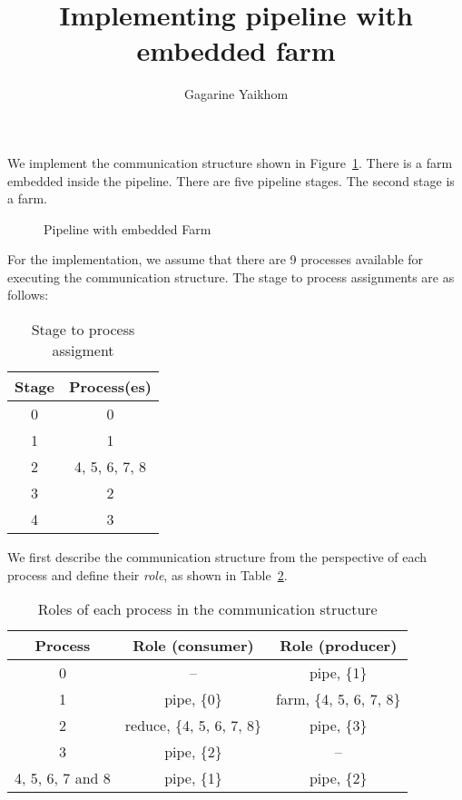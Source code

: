 \documentclass[a4paper,11pt]{amsart}
\title{Implementing pipeline with embedded farm}
\author{Gagarine Yaikhom}
\begin{document}
\maketitle

We implement the communication structure shown in \mbox{Figure
  \ref{fig:Pipeline Farm}}. There is a farm embedded inside the
pipeline. There are five pipeline stages. The second stage is a farm.

\begin{figure}[htbp]
  \centering
  \caption{Pipeline with embedded Farm}
  \label{fig:Pipeline Farm}
\end{figure}

For the implementation, we assume that there are 9 processes available
for executing the communication structure. The stage to process
assignments are as follows:

\begin{table}[htbp]
  \centering
  \begin{tabular}{|c|c|}
    \hline
    Stage & Process(es) \\  \hline
    0 & 0\\ \hline
    1 & 1\\ \hline
    2 & 4, 5, 6, 7, 8\\ \hline
    3 & 2\\ \hline
    4 & 3\\ \hline
  \end{tabular}
  \caption{Stage to process assigment}
  \label{tab:Stage to Process assignment}
\end{table}

We first describe the communication structure from the perspective of
each process and define their \emph{role}, as shown in \mbox{Table
  \ref{tab:Process Roles}}.

\begin{table}[htbp]
  \centering
  \begin{tabular}{|c|c|c|}
    \hline
    Process & Role (consumer) & Role (producer) \\  \hline
    0 & -- & pipe, \{1\}\\ \hline
    1 & pipe, \{0\} & farm, \{4, 5, 6, 7, 8\}\\ \hline
    2 & reduce, \{4, 5, 6, 7, 8\} & pipe, \{3\}\\ \hline
    3 & pipe, \{2\} & -- \\ \hline
    4, 5, 6, 7 and 8 & pipe, \{1\} & pipe, \{2\}\\ \hline
  \end{tabular}
  \caption{Roles of each process in the communication structure}
  \label{tab:Process Roles}
\end{table}
\end{document}
